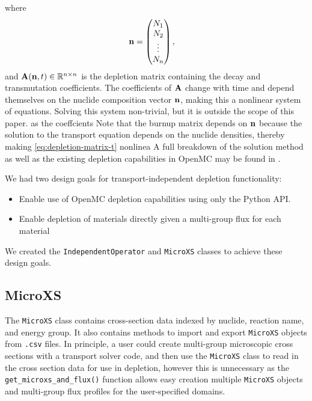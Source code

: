     where
    \begin{equation}
      \mathbf{n} = \begin{pmatrix} N_1 \\ N_2 \\ \vdots \\ N_n \end{pmatrix}, \quad
    \end{equation}
    and $\mathbf{A}(\mathbf{n},t) \in \mathbb{R}^{n\times n}$ is the depletion
    matrix containing the decay and transmutation coefficients. The
    coefficients of $\mathbf{A}$ change with time and depend themselves on the
    nuclide composition vector $\mathbf{n}$, making this a nonlinear system of
    equations. Solving this system non-trivial, but it is outside the scope of
    this paper.  as the coeffcients  Note that the burnup matrix
    depends on $\mathbf{n}$ because the solution to the transport equation depends
    on the nuclide densities, thereby making \ref{eq:depletion-matrix-t} nonlinea
    A full breakdown of the solution method as well as the existing depletion
    capabilities in OpenMC may be found in \cite{romano_depletion_2021}.

    We had two design goals for transport-independent depletion functionality:
    \begin{itemize}
        \item Enable use of OpenMC depletion capabilities using only the Python API.
        \item Enable depletion of materials directly given a multi-group flux
            for each material 
    \end{itemize}
    
    We created the \verb.IndependentOperator. and \verb.MicroXS. classes to
    achieve these design goals.    
    \subsection{MicroXS}
        \label{sub:microxs}
        The \verb.MicroXS. class contains cross-section data indexed by nuclide,
        reaction name, and energy group. It also contains methods to import and
        export \verb.MicroXS. objects from \verb,.csv, files. In principle, a
        user could create multi-group microscopic cross sections with a
        transport solver code, and then use the \verb.MicroXS.  class to read in
        the cross section data for use in depletion, however this is unnecessary
        as the \verb.get_microxs_and_flux(). function allows easy creation
        multiple \verb.MicroXS. objects and multi-group flux profiles for the
        user-specified domains.

